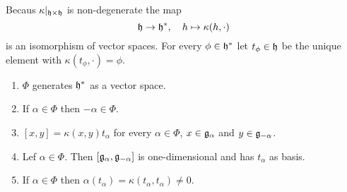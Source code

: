 \begin{defi}
 Becaus $\kappa|_{\mathfrak{h} \times \mathfrak{h}}$ is non-degenerate the map
 \[
  \mathfrak{h} \to \mathfrak{h}^*, \quad h \mapsto \kappa(h, \cdot)
 \]
 is an isomorphism of vector spaces. For every $\phi \in \mathfrak{h}^*$ let $t_\phi \in \mathfrak{h}$ be the unique element with $\kappa(t_\phi, \cdot) = \phi$.
\end{defi}


\begin{prop}
 \begin{enumerate}[leftmargin=*]
  \item 
   $\Phi$ generates $\mathfrak{h}^*$ as a vector space.
  \item
   If $\alpha \in \Phi$ then $-\alpha \in \Phi$.
  \item
   $[x,y] = \kappa(x,y) t_\alpha$ for every $\alpha \in \Phi$, $x \in \mathfrak{g}_\alpha$ and $y \in \mathfrak{g}_{-\alpha}$.
  \item
   Lef $\alpha \in \Phi$. Then $[\mathfrak{g}_\alpha, \mathfrak{g}_{-\alpha}]$ is one-dimensional and has $t_\alpha$ as basis.
  \item
   If $\alpha \in \Phi$ then $\alpha(t_\alpha) = \kappa(t_\alpha, t_\alpha) \neq 0$.
 \end{enumerate}
\end{prop}
